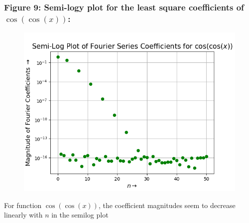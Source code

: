 \documentclass[12pt, a4paper]{article}
\begin{document}
\subsubsection{Figure 9: Semi-logy plot for the least square coefficients of $\cos(\cos(x))$:}
\vspace*{-0.5cm}
\begin{figure}[H]
    \centering
    \includegraphics[scale = 0.75]{Figure_9.png}
    \label{fig:sample}
\end{figure}
\vspace*{-0.5cm}
\begin{center}
    For function $\cos(\cos(x))$, the coefficient magnitudes seem to decrease linearly with $n$ in the semilog plot
\end{center}
\end{document}
